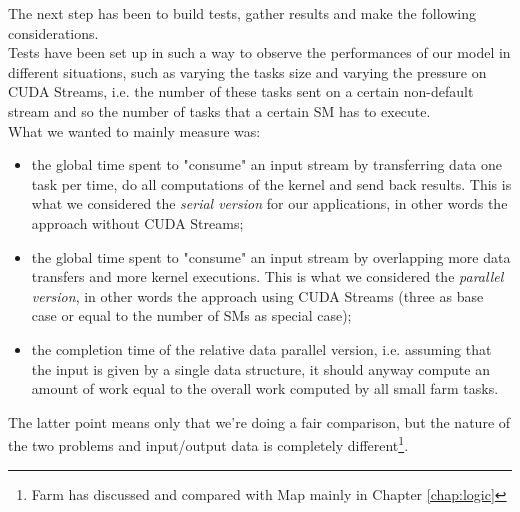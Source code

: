  The next step has been to build tests, gather results and make the following considerations.\\
 Tests have been set up in such a way to observe the performances of our model in different situations, such as varying the tasks size and varying the pressure on CUDA Streams, i.e. the number of these tasks sent on a certain non-default stream and so the number of tasks that a certain SM has to execute.\\
 What we wanted to mainly measure was:
 \begin{itemize}
 	\item the global time spent to "consume" an input stream by transferring data one task per time, do all computations of the kernel and send back results. This is what we considered the \textit{serial version} for our applications, in other words the approach without CUDA Streams;
 	
 	\item the global time spent to "consume" an input stream by overlapping more data transfers and more kernel executions. This is what we considered the \textit{parallel version}, in other words the approach using CUDA Streams (three as base case or equal to the number of SMs as special case);
 	
 	\item the completion time of the relative data parallel version, i.e. assuming that the input is given by a single data structure, it should anyway compute an amount of work equal to the overall work computed by all small farm tasks. 	
 \end{itemize}
 The latter point means only that we're doing a fair comparison, but the nature of the two problems and input/output data is completely different\footnote{Farm has discussed and compared with Map mainly in Chapter \ref{chap:logic}}.
 
